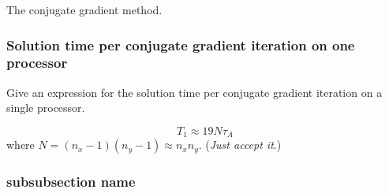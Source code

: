 \begin{algorithm}[H]
  \caption{The conjugate gradient method.}
\end{algorithm}

\subsubsection{Solution time per conjugate gradient iteration on one processor} %
\label{ssub:solution_per_conjugate_gradient_iteration_on_one_processor}

\begin{question}
  Give an expression for the solution time per conjugate gradient iteration on a single processor.
\end{question}

\begin{equation}
  T_1 \approx 19 N \tau_A
\end{equation}
where $N=(n_x-1)(n_y-1) \approx n_x n_y$. (\emph{Just accept it}.)


\subsubsection{subsubsection name} %
\label{ssub:subsubsection_name}



